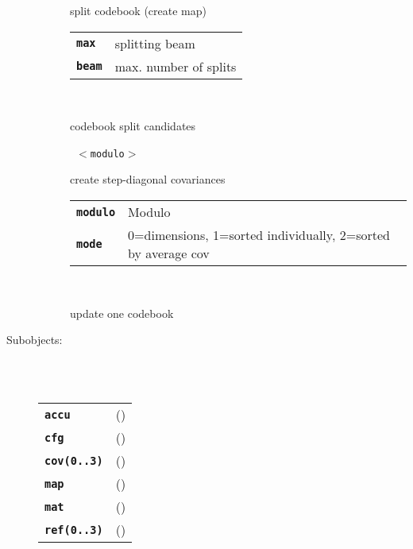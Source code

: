 \begin{description}
\begin{description}
        split codebook (create map)

      \begin{tabular}{ll}
 \texttt{\textbf{max}} &   splitting beam  \\
 \texttt{\textbf{beam}} &  max. number of splits  \\
      \end{tabular}
       \texttt{} \

        codebook split candidates

       \texttt{ $<$modulo$>$ } \

        create step-diagonal covariances

      \begin{tabular}{ll}
 \texttt{\textbf{modulo}} &  Modulo  \\
 \texttt{\textbf{mode}} &     0=dimensions, 1=sorted individually, 2=sorted by average cov  \\
      \end{tabular}
       \texttt{} \

        update one codebook

    \end{description}

  \item[Subobjects:] \hfill \\
\ 
    \begin{tabular}{ll}
      \texttt{\textbf{accu}} & (\Jref{module}{CodebookAccu}) \\
      \texttt{\textbf{cfg}} & (\Jref{module}{Cbcfg}) \\
      \texttt{\textbf{cov(0..3)}} & (\Jref{module}{???}) \\
      \texttt{\textbf{map}} & (\Jref{module}{CodebookMap}) \\
      \texttt{\textbf{mat}} & (\Jref{module}{FMatrix}) \\
      \texttt{\textbf{ref(0..3)}} & (\Jref{module}{???}) \\
    \end{tabular}
\vspace{3mm}

\end{description}

